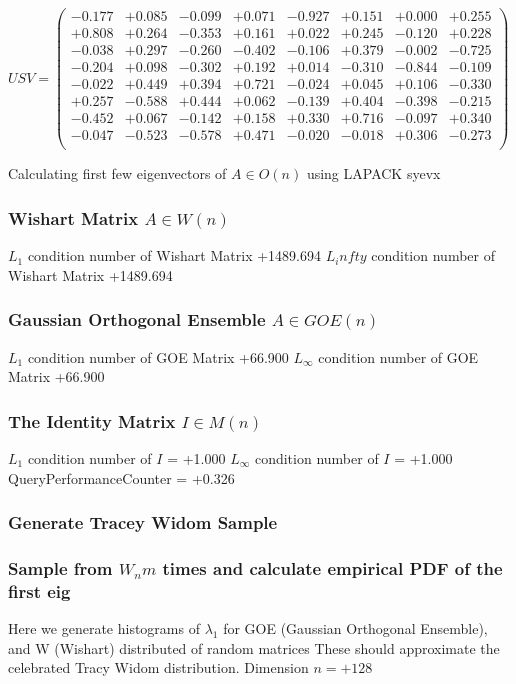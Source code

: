\documentclass[9pt]{article}
\theoremstyle{plain}
\theoremstyle{definition}
\theoremstyle{remark}
\numberwithin{equation}{section}
\begin{document}
$U S V = \left(
\begin{array}{
cccccccc}
-0.177 & +0.085 & -0.099 & +0.071 & -0.927 & +0.151 & +0.000 & +0.255 \\
+0.808 & +0.264 & -0.353 & +0.161 & +0.022 & +0.245 & -0.120 & +0.228 \\
-0.038 & +0.297 & -0.260 & -0.402 & -0.106 & +0.379 & -0.002 & -0.725 \\
-0.204 & +0.098 & -0.302 & +0.192 & +0.014 & -0.310 & -0.844 & -0.109 \\
-0.022 & +0.449 & +0.394 & +0.721 & -0.024 & +0.045 & +0.106 & -0.330 \\
+0.257 & -0.588 & +0.444 & +0.062 & -0.139 & +0.404 & -0.398 & -0.215 \\
-0.452 & +0.067 & -0.142 & +0.158 & +0.330 & +0.716 & -0.097 & +0.340 \\
-0.047 & -0.523 & -0.578 & +0.471 & -0.020 & -0.018 & +0.306 & -0.273 \\
\end{array}
\right)$ \newline 

Calculating first few eigenvectors of $A \in O(n)$ using LAPACK syevx

\subsubsection{Wishart Matrix $A \in W(n)$}
$L_1$ condition number of Wishart Matrix +1489.694
$L_infty$ condition number of Wishart Matrix +1489.694
\subsubsection{Gaussian Orthogonal Ensemble $A \in GOE(n)$}
$L_1$ condition number of GOE Matrix +66.900
$L_\infty$ condition number of GOE Matrix +66.900
\subsubsection{The Identity Matrix $I \in M(n)$}
$L_1$ condition number of $I$ = +1.000
$L_\infty$ condition number of $I$ = +1.000
QueryPerformanceCounter  =  +0.326
\subsubsection{Generate Tracey Widom Sample}
\subsubsection{Sample from $W_n m$ times and calculate empirical PDF of the first eig}
Here we generate histograms of $\lambda_1$ for GOE (Gaussian Orthogonal Ensemble), and W (Wishart) 		 distributed of random matrices
These should approximate the celebrated Tracy Widom distribution.
Dimension $n = +128$
\end{document}
